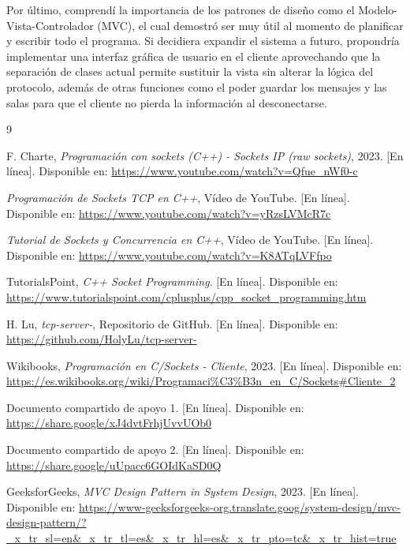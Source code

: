 \documentclass[11pt,a4paper]{article}
\begin{document}
Por último, comprendí la importancia de los patrones de diseño como el Modelo-Vista-Controlador (MVC), el cual demostró ser muy útil al momento de planificar y escribir todo el programa. Si decidiera expandir el sistema a futuro, propondría implementar una interfaz gráfica de usuario en el cliente aprovechando que la separación de clases actual permite sustituir la vista sin alterar la lógica del protocolo, además de otras funciones como el poder guardar los mensajes y las salas para que el cliente no pierda la información al desconectarse.

\begin{thebibliography}{9}

F. Charte, \textit{Programación con sockets (C++) - Sockets IP (raw sockets)}, 2023. [En línea]. Disponible en: \url{https://www.youtube.com/watch?v=Qfue_nWf0-c}

\textit{Programación de Sockets TCP en C++}, Vídeo de YouTube. [En línea]. Disponible en: \url{https://www.youtube.com/watch?v=yRzsLVMcR7c}

\textit{Tutorial de Sockets y Concurrencia en C++}, Vídeo de YouTube. [En línea]. Disponible en: \url{https://www.youtube.com/watch?v=K8ATqLVFfpo}

TutorialsPoint, \textit{C++ Socket Programming}. [En línea]. Disponible en: \url{https://www.tutorialspoint.com/cplusplus/cpp_socket_programming.htm}

H. Lu, \textit{tcp-server-}, Repositorio de GitHub. [En línea]. Disponible en: \url{https://github.com/HolyLu/tcp-server-}

Wikibooks, \textit{Programación en C/Sockets - Cliente}, 2023. [En línea]. Disponible en: \url{https://es.wikibooks.org/wiki/Programaci%C3%B3n_en_C/Sockets#Cliente_2}

Documento compartido de apoyo 1. [En línea]. Disponible en: \url{https://share.google/xJ4dvtFrhjUvvUOb0}

Documento compartido de apoyo 2. [En línea]. Disponible en: \url{https://share.google/uUpacc6GOIdKaSD0Q}

GeeksforGeeks, \textit{MVC Design Pattern in System Design}, 2023. [En línea]. Disponible en: \url{https://www-geeksforgeeks-org.translate.goog/system-design/mvc-design-pattern/?_x_tr_sl=en&_x_tr_tl=es&_x_tr_hl=es&_x_tr_pto=tc&_x_tr_hist=true}

\end{thebibliography}
\end{document}
